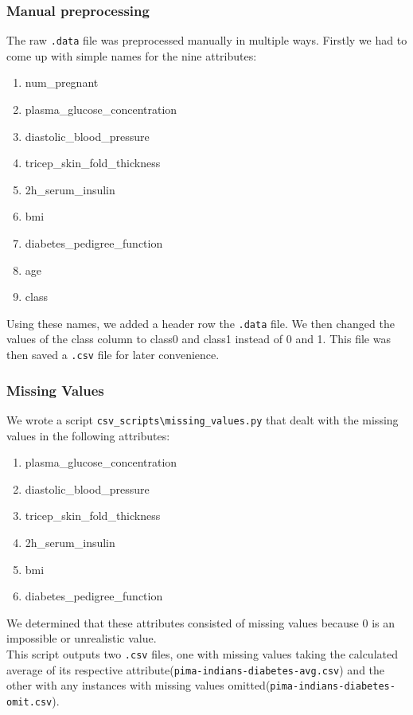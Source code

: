 \documentclass{article}
\renewcommand{\tt}{\texttt}
\begin{document}
\subsubsection{Manual preprocessing}
The raw \tt{.data} file was preprocessed manually in multiple ways. Firstly we had to come up with simple names for the nine attributes:
\begin{enumerate}[1.]
\item num\_pregnant
\item plasma\_glucose\_concentration
\item diastolic\_blood\_pressure
\item tricep\_skin\_fold\_thickness
\item 2h\_serum\_insulin
\item bmi
\item diabetes\_pedigree\_function
\item age
\item class
\end{enumerate}
Using these names, we added a header row the \tt{.data} file. We then changed the values of the class column to class0 and class1 instead of 0 and 1. This file was then saved a \tt{.csv} file for later convenience.

\subsubsection{Missing Values}
We wrote a script \tt{csv\_scripts\textbackslash missing\_values.py} that dealt with the missing values in the following attributes:
\begin{enumerate}[1.]
\item plasma\_glucose\_concentration
\item diastolic\_blood\_pressure
\item tricep\_skin\_fold\_thickness
\item 2h\_serum\_insulin
\item bmi
\item diabetes\_pedigree\_function
\end{enumerate} 

We determined that these attributes consisted of missing values because 0 is an impossible or unrealistic value.\\

This script outputs two \tt{.csv} files, one with missing values taking the calculated average of its respective attribute(\tt{pima-indians-diabetes-avg.csv}) and the other with any instances with missing values omitted(\tt{pima-indians-diabetes-omit.csv}).\\
\end{document}
